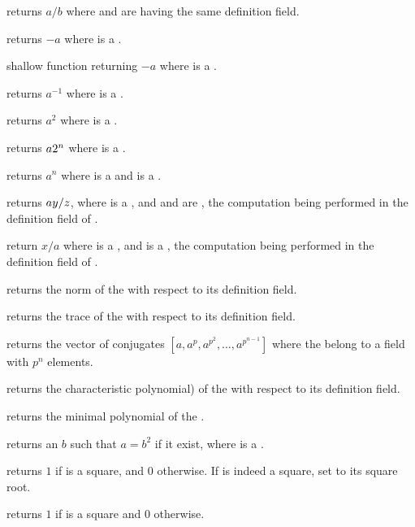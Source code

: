  returns $a/b$ where  and  are
 having the same definition field.

 returns $-a$ where  is a .

 shallow function returning $-a$ where  is a
.

 returns $a^{-1}$ where  is a .

 returns $a^2$ where  is a .

 returns $a\*2^n$ where  is a
.

 returns $a^n$ where  is a 
and is a .

 returns $a\*y/z$, where 
is a , and  and  are , the computation being
performed in the definition field of .

 return $x/a$ where  is a
, and  is a , the computation being
performed in the definition field of .

 returns the norm of the   with
respect to its definition field.

 returns the trace of the   with
respect to its definition field.

 returns the vector of conjugates
$[a,a^p,a^{p^2},\ldots,a^{p^{n-1}}]$ where the   belong to a
field with $p^n$ elements.

 returns the characteristic polynomial) of the
  with respect to its definition field.

 returns the minimal polynomial of
the  .

 returns an  $b$ such that $a=b^2$ if
it exist, where  is a .

 returns $1$ if  is a
square, and $0$ otherwise. If  is indeed a square, set  to its
square root.

 returns $1$ if  is a square and $0$
otherwise.

